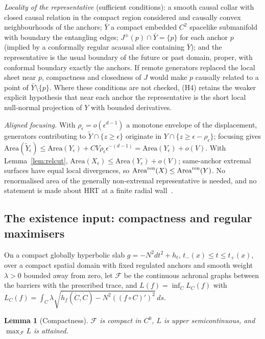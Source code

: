 \documentclass[aps,prd,onecolumn,superscriptaddress,nofootinbib,amsmath,amssymb,11pt]{revtex4-2}
\newtheorem{lemma}[theorem]{Lemma}
\theoremstyle{definition}
\newcommand{\eps}{\epsilon}
\begin{document}
\emph{Locality of the representative} (sufficient conditions): a smooth causal collar with closed causal relation in the compact
region considered and causally convex neighbourhoods of the anchors; $\bar Y$ a compact embedded $C^2$ spacelike submanifold with
boundary the entangling edges; $J^\pm(p)\cap\bar Y=\{p\}$ for each anchor $p$ (implied by a conformally regular acausal slice containing
$\bar Y$); and the representative is the usual boundary of the future or past domain, proper, with conformal boundary exactly the
anchors. If remote generators replaced the local sheet near $p$, compactness and closedness of $J$ would make $p$ causally related to a
point of $\bar Y\setminus\{p\}$. Where these conditions are not checked, (H4) retains the weaker explicit hypothesis that near each anchor
the representative is the short local null-normal projection of $Y$ with bounded derivatives.

\emph{Aligned focusing.} With $\rho_\eps=o(\eps^{d-1})$ a monotone envelope of the displacement, generators contributing to
$\tilde Y\cap\{z\ge\eps\}$ originate in $Y\cap\{z\ge\eps-\rho_\eps\}$; focusing gives
$\mathrm{Area}(\tilde Y_\eps)\le\mathrm{Area}(Y_\eps)+CV\rho_\eps\eps^{-(d-1)}=\mathrm{Area}(Y_\eps)+o(V)$. With Lemma~\ref{lem:relcut},
$\mathrm{Area}(X_\eps)\le\mathrm{Area}(Y_\eps)+o(V)$; same-anchor extremal surfaces have equal local divergences, so
$\mathrm{Area}^{\rm ren}(X)\le\mathrm{Area}^{\rm ren}(Y)$. No renormalised area of the generally non-extremal representative is needed, and no
statement is made about HRT at a finite radial wall~\cite{GradoWhiteMarolfWeinberg2021}.

\subsection{The existence input: compactness and regular maximisers}\label{sec:stripexist}

On a compact globally hyperbolic slab $g=-N^2dt^2+h_t$, $t_-(x)\le t\le t_+(x)$, over a compact spatial domain with fixed regulated anchors
and smooth weight $\lambda>0$ bounded away from zero, let $\mathcal F$ be the continuous achronal graphs between the barriers with the
prescribed trace, and $L(f)=\inf_CL_C(f)$ with $L_C(f)=\int_C\lambda\sqrt{h_f(\dot C,\dot C)-N^2((f\circ C)')^2}\,ds$.

\begin{lemma}[Compactness]\label{lem:stripcompact}
$\mathcal F$ is compact in $C^0$, $L$ is upper semicontinuous, and $\max_{\mathcal F}L$ is attained.
\end{lemma}
\end{document}
